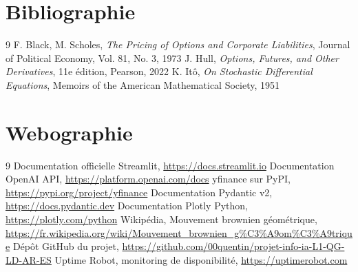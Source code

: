 \documentclass[a4paper, 12pt, twoside]{article}
\begin{document}
\newpage

\section{Bibliographie}

\renewcommand{\bibname}{}
\renewcommand{\refname}{}
\begin{thebibliography}{9}
    F. Black, M. Scholes,
   {\it The Pricing of Options and Corporate Liabilities},
   Journal of Political Economy, Vol. 81, No. 3, 1973
    J. Hull,
   {\it Options, Futures, and Other Derivatives}, 11e édition, Pearson, 2022
    K. Itô,
   {\it On Stochastic Differential Equations},
   Memoirs of the American Mathematical Society, 1951
\end{thebibliography}

\newpage

\section{Webographie}

\begin{thebibliography}{9}
    Documentation officielle Streamlit,
   \url{https://docs.streamlit.io}
    Documentation OpenAI API,
   \url{https://platform.openai.com/docs}
    yfinance sur PyPI,
   \url{https://pypi.org/project/yfinance}
    Documentation Pydantic v2,
   \url{https://docs.pydantic.dev}
    Documentation Plotly Python,
   \url{https://plotly.com/python}
    Wikipédia, Mouvement brownien géométrique,
   \url{https://fr.wikipedia.org/wiki/Mouvement_brownien_g\%C3\%A9om\%C3\%A9trique}
    Dépôt GitHub du projet,
   \url{https://github.com/00quentin/projet-info-ia-L1-QG-LD-AR-ES}
    Uptime Robot, monitoring de disponibilité,
   \url{https://uptimerobot.com}
\end{thebibliography}

\newpage

\appendix
\makeatletter
\def\@seccntformat#1{Annexe~\csname the#1\endcsname:\quad}
\makeatother
\end{document}
